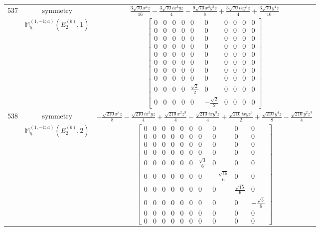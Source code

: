 \documentclass[fleqn,8pt,landscape]{jsarticle}
\begin{document}
\begin{longtable}{ccc}
$ 537 $ & $ \text{symmetry} $ & $ \frac{3 \sqrt{70} x^{4} z}{16} - \frac{3 \sqrt{70} i x^{3} y z}{4} - \frac{9 \sqrt{70} x^{2} y^{2} z}{8} + \frac{3 \sqrt{70} i x y^{3} z}{4} + \frac{3 \sqrt{70} y^{4} z}{16} $ \\
$  $ & $ \mathbb{M}_{5}^{(1,-1;a)}(E_{2}^{(b)},1) $ & $ \begin{bmatrix} 0 & 0 & 0 & 0 & 0 & 0 & 0 & 0 & 0 & 0 \\ 0 & 0 & 0 & 0 & 0 & 0 & 0 & 0 & 0 & 0 \\ 0 & 0 & 0 & 0 & 0 & 0 & 0 & 0 & 0 & 0 \\ 0 & 0 & 0 & 0 & 0 & 0 & 0 & 0 & 0 & 0 \\ 0 & 0 & 0 & 0 & 0 & 0 & 0 & 0 & 0 & 0 \\ 0 & 0 & 0 & 0 & 0 & 0 & 0 & 0 & 0 & 0 \\ 0 & 0 & 0 & 0 & 0 & 0 & 0 & 0 & 0 & 0 \\ 0 & 0 & 0 & 0 & 0 & 0 & 0 & 0 & 0 & 0 \\ 0 & 0 & 0 & 0 & \frac{\sqrt{2}}{2} & 0 & 0 & 0 & 0 & 0 \\ 0 & 0 & 0 & 0 & 0 & - \frac{\sqrt{2}}{2} & 0 & 0 & 0 & 0 \end{bmatrix} $ \\ \hline
$ 538 $ & $ \text{symmetry} $ & $ - \frac{\sqrt{210} x^{4} z}{8} - \frac{\sqrt{210} i x^{3} y z}{4} + \frac{\sqrt{210} x^{2} z^{3}}{4} - \frac{\sqrt{210} i x y^{3} z}{4} + \frac{\sqrt{210} i x y z^{3}}{2} + \frac{\sqrt{210} y^{4} z}{8} - \frac{\sqrt{210} y^{2} z^{3}}{4} $ \\
$  $ & $ \mathbb{M}_{5}^{(1,-1;a)}(E_{2}^{(b)},2) $ & $ \begin{bmatrix} 0 & 0 & 0 & 0 & 0 & 0 & 0 & 0 & 0 & 0 \\ 0 & 0 & 0 & 0 & 0 & 0 & 0 & 0 & 0 & 0 \\ 0 & 0 & 0 & 0 & 0 & 0 & 0 & 0 & 0 & 0 \\ 0 & 0 & 0 & 0 & 0 & 0 & 0 & 0 & 0 & 0 \\ 0 & 0 & 0 & 0 & 0 & 0 & \frac{\sqrt{3}}{6} & 0 & 0 & 0 \\ 0 & 0 & 0 & 0 & 0 & 0 & 0 & - \frac{\sqrt{15}}{6} & 0 & 0 \\ 0 & 0 & 0 & 0 & 0 & 0 & 0 & 0 & \frac{\sqrt{15}}{6} & 0 \\ 0 & 0 & 0 & 0 & 0 & 0 & 0 & 0 & 0 & - \frac{\sqrt{3}}{6} \\ 0 & 0 & 0 & 0 & 0 & 0 & 0 & 0 & 0 & 0 \\ 0 & 0 & 0 & 0 & 0 & 0 & 0 & 0 & 0 & 0 \end{bmatrix} $ \\ \hline

\end{longtable}
\end{document}
